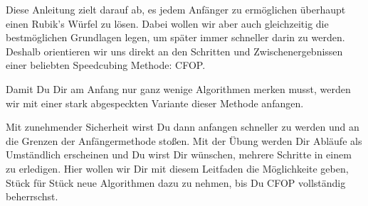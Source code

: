 Diese Anleitung zielt darauf ab, es jedem Anfänger zu ermöglichen überhaupt einen Rubik's Würfel zu lösen.
Dabei wollen wir aber auch gleichzeitig die bestmöglichen Grundlagen legen, um später immer schneller darin zu werden.
Deshalb orientieren wir uns direkt an den Schritten und Zwischenergebnissen einer beliebten Speedcubing Methode: CFOP.

Damit Du Dir am Anfang nur ganz wenige Algorithmen merken musst, werden wir mit einer stark abgespeckten Variante dieser Methode anfangen.

Mit zunehmender Sicherheit wirst Du dann anfangen schneller zu werden und an die Grenzen der Anfängermethode stoßen.
Mit der Übung werden Dir Abläufe als Umständlich erscheinen und Du wirst Dir wünschen, mehrere Schritte in einem zu erledigen.
Hier wollen wir Dir mit diesem Leitfaden die Möglichkeite geben, Stück für Stück neue Algorithmen dazu zu nehmen, bis Du CFOP vollständig beherrschst.

